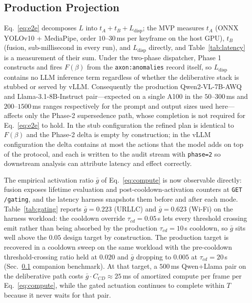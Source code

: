 \subsection{\textbf{Production Projection}}
\label{sec:res-projection}
Eq.~\eqref{eq:e2e} decomposes $L$ into $t_A + t_B + L_{\text{disp}}$; the MVP
measures $t_A$ (ONNX YOLOv10 + MediaPipe, order $10$--$30$\,ms per keyframe
on the host GPU), $t_B$ (fusion, sub-millisecond in every run), and
$L_{\text{disp}}$ directly, and Table~\ref{tab:latency} is a measurement of
their sum. Under the two-phase dispatcher, Phase 1 constructs and fires
$F(\beta)$ from the \texttt{axon:anomalies} record itself, so
$L_{\text{disp}}$ contains no LLM inference term regardless of whether the
deliberative stack is stubbed or served by vLLM. Consequently the
production Qwen2-VL-7B-AWQ and Llama-3.1-8B-Instruct pair---expected on a
single A100 in the $50$--$300$\,ms and $200$--$1500$\,ms ranges
respectively for the prompt and output sizes used here---affects only the
Phase-2 supersedence path, whose completion is not required for
Eq.~\eqref{eq:e2e} to hold. In the stub configuration the refined plan is
identical to $F(\beta)$ and the Phase-2 delta is empty by construction; in
the vLLM configuration the delta contains at most the actions that the
model adds on top of the protocol, and each is written to the audit stream
with \texttt{phase=2} so downstream analysis can attribute latency and
effect correctly.

The empirical activation ratio $\bar g$ of Eq.~\eqref{eq:compute} is now
observable directly: fusion exposes lifetime evaluation and
post-cooldown-activation counters at \texttt{GET /gating}, and the latency
harness snapshots them before and after each mode.
Table~\ref{tab:gating} reports $\bar g=0.223$ (URLLC) and $\bar g=0.623$
(Wi-Fi) on the harness workload: the cooldown override $\tau_{cd}=0.05$\,s
lets every threshold crossing emit rather than being absorbed by the
production $\tau_{cd}=10$\,s cooldown, so $\bar g$ sits well above the
$0.05$ design target by construction. The production target is recovered
in a cooldown sweep on the same workload with the pre-cooldown
threshold-crossing ratio held at $0.020$ and $\bar g$ dropping to
$0.005$ at $\tau_{cd}=20$\,s (Sec.~\ref{sec:res-projection} companion
benchmark). At that target, a $500$\,ms
Qwen+Llama pair on the deliberative path costs
$\bar g\cdot C_{CD}\approx 25$\,ms of amortized compute per frame per
Eq.~\eqref{eq:compute}, while the gated actuation continues to complete
within $T$ because it never waits for that pair.
